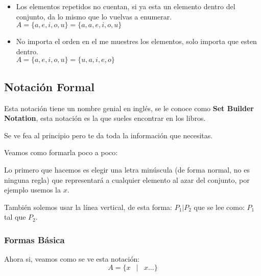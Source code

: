 \documentclass[12pt]{report}                                    %
\DeclareMathOperator \Space {\quad}                             %
\DeclareMathOperator \MiniSpace {\;}                            %
\newcommand \Such {\MiniSpace|\MiniSpace}                       %
\begin{document}
                \begin{itemize}
                    \item Los elementos repetidos no cuentan, si ya esta un elemento dentro del
                        conjunto, da lo mismo que lo vuelvas a enumerar.\\
                        $A = \{a, e, i, o, u\} = \{a, a, e, i, o, u\}$

                    \item No importa el orden en el me muestres los elementos,
                        solo importa que esten dentro.\\
                        $A = \{a, e, i, o, u\} = \{u, a, i, e, o\}$
                \end{itemize}



            \clearpage
            \subsection{Notación Formal} 

                Esta notación tiene un nombre genial en inglés, se le conoce como \textbf{Set Builder Notation},
                esta notación es la que sueles encontrar en los libros. 

                Se ve fea al principio pero te da toda la información que necesitas.

                Veamos como formarla poco a poco:

                Lo primero que hacemos es elegir una letra minúscula (de forma normal, no es ninguna regla)
                que representará a cualquier elemento al azar del conjunto, por ejemplo usemos la $x$.

                También solemos usar la línea vertical, de esta forma: $P_1 | P_2$ que se lee como: 
                $P_1$ tal que $P_2$.  

                \subsubsection*{Formas Básica}

                    Ahora si, veamos como se ve esta notación:
                    \begin{equation}   
                        A = \{ x \Such x \dots \}
                    \end{equation}
\end{document}
